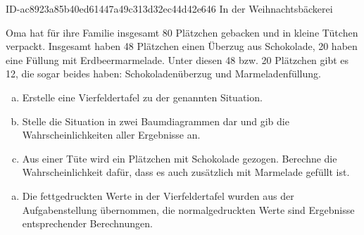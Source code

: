 \begin{exercise}
      {ID-ac8923a85b40ed61447a49c313d32ec44d42e646}
      {In der Weihnachtsbäckerei}
  \ifproblem\problem\par
    Oma hat für ihre Familie insgesamt 80 Plätzchen
    gebacken und in kleine Tütchen verpackt.
    Insgesamt haben 48 Plätzchen einen Überzug aus
    Schokolade, 20 haben eine Füllung mit Erdbeermarmelade.
    Unter diesen 48 bzw. 20 Plätzchen gibt es 12, die
    sogar beides haben: Schokoladenüberzug und
    Marmeladenfüllung.
    \begin{enumerate}[a)]
      \item Erstelle eine Vierfeldertafel zu der
            genannten Situation.
      \item Stelle die Situation in zwei
            Baumdiagrammen dar und gib die
            Wahrscheinlichkeiten aller Ergebnisse an.
      \item Aus einer Tüte wird ein Plätzchen mit
            Schokolade gezogen. Berechne die
            Wahrscheinlichkeit dafür, dass es auch
            zusätzlich mit Marmelade gefüllt ist.
    \end{enumerate}
  \fi
  \ifoutcome\outcome%
    \begin{enumerate}[a)]
      \item Die fettgedruckten Werte in der
            Vierfeldertafel wurden aus der
            Aufgabenstellung übernommen, die
            normalgedruckten Werte sind
            Ergebnisse entsprechender
            Berechnungen.\par
            \begin{minipage}{0.40\linewidth}
              \begin{fofotab}
              \end{fofotab}
            \end{minipage}%
            \begin{minipage}{0.38\linewidth}

\end{minipage}
\end{enumerate}
\end{exercise}
